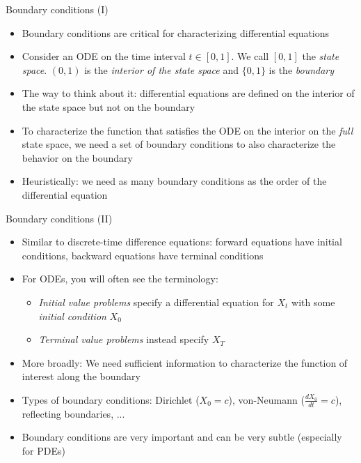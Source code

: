 \documentclass[10pt]{beamer}
\begin{document}
\begin{frame}{Boundary conditions (I)}
\begin{itemize}
\item Boundary conditions are critical for characterizing differential equations

\item Consider an ODE on the time interval $t \in [0, 1]$. We call $[0, 1]$ the \textit{state space}. $(0, 1)$ is the \textit{interior of the state space} and $\{0, 1\}$ is the \textit{boundary}

\item The way to think about it: differential equations are defined on the interior of the state space but not on the boundary

\item To characterize the function that satisfies the ODE on the interior on the \textit{full} state space, we need a set of boundary conditions to also characterize the behavior on the boundary

\item Heuristically: we need as many boundary conditions as the order of the differential equation
\end{itemize}
\end{frame}


\begin{frame}{Boundary conditions (II)}
\begin{itemize}
\item Similar to discrete-time difference equations: forward equations have initial conditions, backward equations have terminal conditions

\item For ODEs, you will often see the terminology:
\begin{itemize}
	\item \textit{Initial value problems} specify a differential equation for $X_t$ with some \textit{initial condition} $X_0$
	
	\vspace{-3mm}
	\item \textit{Terminal value problems} instead specify $X_T$
\end{itemize}

\item More broadly: We need sufficient information to characterize the function of interest along the boundary

\item Types of boundary conditions: Dirichlet ($X_0 = c$), von-Neumann ($\frac{dX_0}{dt} = c$), reflecting boundaries, ...

\item Boundary conditions are very important and can be very subtle (especially for PDEs)
\end{itemize}
\end{frame}
\end{document}
